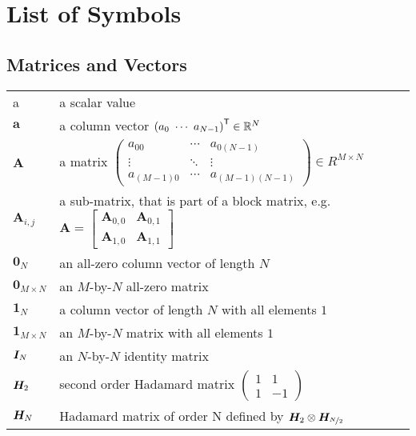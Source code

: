 \chapter*{List of Symbols}
\section*{Matrices and Vectors}
\begin{tabular}{ p{2cm} l }
    a           & a scalar value \\

    $\bm{a}$    & a column vector $\left( a_0 \ \cdots \ a_{N-1} \right)^\mathsf{T} \in \mathbb{R}^{N}$ \\

    $\bm{A}$    & a matrix
    $\begin{pmatrix}
        a_{00} & \cdots & a_{0(N-1)} \\
        \vdots & \ddots & \vdots \\
        a_{(M-1)0} & \cdots & a_{(M-1)(N-1)}
    \end{pmatrix} \in R^{M \times N}
    $ \\
    $\bm{A}_{i,j}$ & a sub-matrix, that is part of a block matrix, e.g.
    $\bm{A} =
    \begin{bmatrix}
        \bm{A}_{0,0} & \bm{A}_{0,1} \\
        \bm{A}_{1,0} & \bm{A}_{1,1}
    \end{bmatrix}
    $ \\

    $\bm{0}_N$  & an all-zero column vector of length $N$ \\
    $\bm{0}_{M \times N}$    & an $M$-by-$N$ all-zero matrix \\
    $\bm{1}_N$  & a column vector of length $N$ with all elements $1$ \\
    $\bm{1}_{M \times N}$    & an $M$-by-$N$ matrix with all elements $1$ \\

    $\bm{I}_{N}$  & an $N$-by-$N$ identity matrix \\

    $\bm{H_}{2}$    & second order Hadamard matrix
    $
    \begin{pmatrix}
        1 & 1 \\
        1 & -1
    \end{pmatrix}
    $ \\

    $\bm{H_}{N}$    & Hadamard matrix of order N defined by $\bm{H_}{2} \otimes \bm{H_}{\nicefrac{N}{2}}$ \\


\end{tabular}
